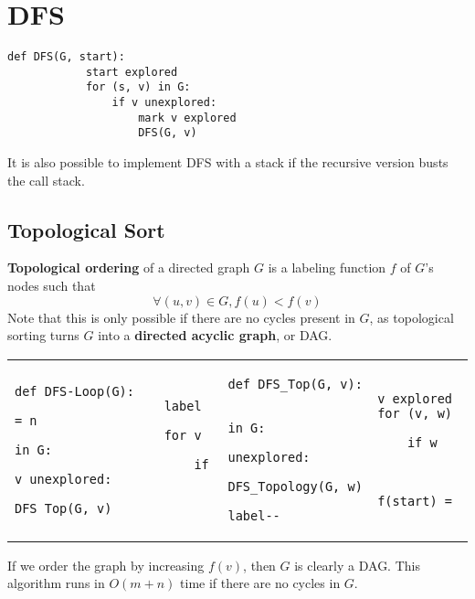 \documentclass[11pt]{article}
\begin{document}
\section{DFS}
	\begin{lstlisting}[autogobble=true]
		def DFS(G, start):
			start explored
			for (s, v) in G:
				if v unexplored:
					mark v explored
					DFS(G, v)
	\end{lstlisting}
	
	It is also possible to implement DFS with a stack if the recursive version busts the call stack.
	
	\subsection{Topological Sort}
		\textbf{Topological ordering} of a directed graph $G$ is a labeling function $f$ of $G$'s nodes such that
		\begin{equation}
			\forall (u,v)\in G, f(u) < f(v)
		\end{equation}
		Note that this is only possible if there are no cycles present in $G$, as topological sorting turns $G$ into a \textbf{directed acyclic graph}, or DAG.
		
		\begin{center}
		\begin{tabular}{ll}
			\begin{lstlisting}[autogobble=true]
				def DFS-Loop(G):
					label = n
					for v in G:
						if v unexplored:
							DFS_Top(G, v)
			\end{lstlisting} 
			& 
			\begin{lstlisting}[autogobble=true]
				def DFS_Top(G, v):
					v explored
					for (v, w) in G:
						if w unexplored:
							DFS_Topology(G, w)
					f(start) = label--
			\end{lstlisting}
		\end{tabular}
		\end{center}
		
		If we order the graph by increasing $f(v)$, then $G$ is clearly a DAG. This algorithm runs in $O(m+n)$ time if there are no cycles in $G$.

%		
%		


\end{document}
